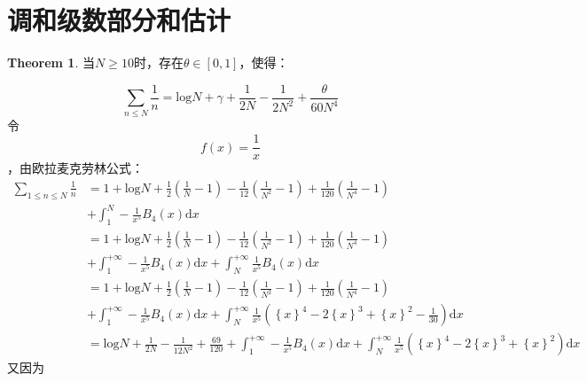 \documentclass[a4paper,12pt]{ctexart}
\newenvironment{prooff}{{\noindent\it\textcolor{black}{Proof}:}\quad}{\par}
\newcommand{\bbrace}[1]{\left\{ #1 \right\} }
\theoremstyle{definition}
\newtheorem{theo}[defn]{Theorem}
\begin{document}
\section{调和级数部分和估计}
\begin{theo}
    当$N\ge10$时，存在$\theta \in [0,1]$，使得：
\end{theo}
\begin{equation}
    \sum_{n\le N}\frac{1}{n}=\text{log}N+\gamma+\frac{1}{2N}-\frac{1}{2N^2}+\frac{\theta}{60N^4}
\end{equation}
\begin{prooff}
    令$$f(x)=\frac{1}{x}$$，由欧拉麦克劳林公式：
    \begin{align*}
        \sum_{1\le n\le N }\frac{1}{n} & =1+\text{log}N+\frac{1}{2}(\frac{1}{N}-1)-\frac{1}{12}(\frac{1}{N^2}-1)+\frac{1}{120}(\frac{1}{N^4}-1)                                                                                 \\
                                       & +\int_1^N-\frac{1}{x^5}B_4(x)\text{d}x                                                                                                                                                 \\
                                       & =1+\text{log}N+\frac{1}{2}(\frac{1}{N}-1)-\frac{1}{12}(\frac{1}{N^2}-1)+\frac{1}{120}(\frac{1}{N^4}-1)                                                                                 \\
                                       & +\int_1^{+\infty}-\frac{1}{x^5}B_4(x)\text{d}x+\int_N^{+\infty}\frac{1}{x^5}B_4(x)\text{d}x                                                                                            \\
                                       & =1+\text{log}N+\frac{1}{2}(\frac{1}{N}-1)-\frac{1}{12}(\frac{1}{N^2}-1)+\frac{1}{120}(\frac{1}{N^4}-1)                                                                                 \\
                                       & +\int_1^{+\infty}-\frac{1}{x^5}B_4(x)\text{d}x+\int_N^{+\infty}\frac{1}{x^5}(\bbrace{x}^4-2\bbrace{x}^3+\bbrace{x}^2-\frac{1}{30})\text{d}x                                            \\
                                       & =\text{log}N+\frac{1}{2N}-\frac{1}{12N^2}+\frac{69}{120}+\int_1^{+\infty}-\frac{1}{x^5}B_4(x)\text{d}x+\int_N^{+\infty}\frac{1}{x^5}(\bbrace{x}^4-2\bbrace{x}^3+\bbrace{x}^2)\text{d}x
    \end{align*}
    又因为

\end{prooff}
\end{document}
